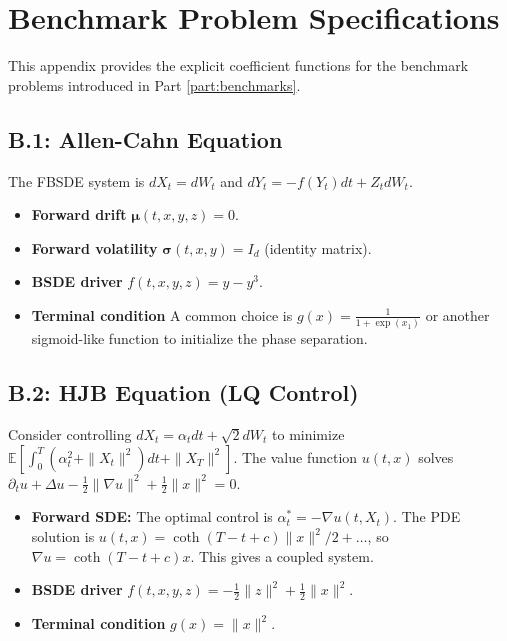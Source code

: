 \documentclass[11pt,letterpaper,oneside]{article}
\theoremstyle{plain}
\theoremstyle{definition}
\theoremstyle{remark}
\begin{document}
\section{Benchmark Problem Specifications}
\label{app:benchmark_details}

This appendix provides the explicit coefficient functions for the benchmark problems introduced in Part \ref{part:benchmarks}.

\subsection{B.1: Allen-Cahn Equation}
The FBSDE system is \(dX_t = dW_t\) and \(dY_t = -f(Y_t)dt + Z_t dW_t\).
\begin{itemize}
    \item \textbf{Forward drift} \(\bm\mu(t,x,y,z) = 0\).
    \item \textbf{Forward volatility} \(\bm\sigma(t,x,y) = I_d\) (identity matrix).
    \item \textbf{BSDE driver} \(f(t,x,y,z) = y - y^3\).
    \item \textbf{Terminal condition} A common choice is \(g(x) = \frac{1}{1+\exp(x_1)}\) or another sigmoid-like function to initialize the phase separation.
\end{itemize}

\subsection{B.2: HJB Equation (LQ Control)}
Consider controlling \(dX_t = \alpha_t dt + \sqrt{2}dW_t\) to minimize \(\mathbb{E}[\int_0^T (\alpha_t^2 + \|X_t\|^2) dt + \|X_T\|^2]\). The value function \(u(t,x)\) solves \(\partial_t u + \Delta u - \frac{1}{2} \|\nabla u\|^2 + \frac{1}{2}\|x\|^2 = 0\).
\begin{itemize}
    \item \textbf{Forward SDE:} The optimal control is \(\alpha_t^* = -\nabla u(t,X_t)\). The PDE solution is \(u(t,x) = \coth(T-t+c)\|x\|^2/2 + \dots\), so \(\nabla u = \coth(T-t+c)x\). This gives a coupled system.
    \item \textbf{BSDE driver} \(f(t,x,y,z) = -\frac{1}{2}\|z\|^2 + \frac{1}{2}\|x\|^2\).
    \item \textbf{Terminal condition} \(g(x) = \|x\|^2\).
\end{itemize}
\end{document}
